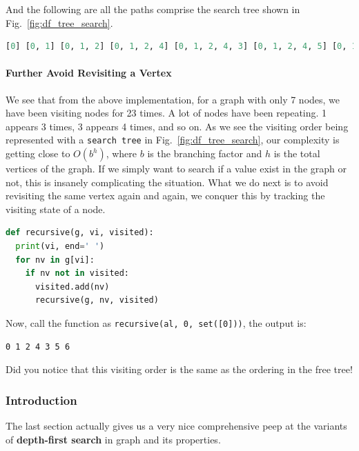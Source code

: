 \documentclass[main.tex]{subfiles}
\begin{document}
And the following are all the paths comprise the search tree shown  in Fig.~\ref{fig:df_tree_search}.
\begin{lstlisting}[language=Python]
[0] [0, 1] [0, 1, 2] [0, 1, 2, 4] [0, 1, 2, 4, 3] [0, 1, 2, 4, 5] [0, 1, 2, 4, 5, 6] [0, 1, 3] [0, 1, 3, 4] [0, 1, 3, 4, 2] [0, 1, 3, 4, 5] [0, 1, 3, 4, 5, 6] [0, 2] [0, 2, 1] [0, 2, 1, 3] [0, 2, 1, 3, 4] [0, 2, 1, 3, 4, 5] [0, 2, 1, 3, 4, 5, 6] [0, 2, 4] [0, 2, 4, 3] [0, 2, 4, 3, 1] [0, 2, 4, 5] [0, 2, 4, 5, 6] 
\end{lstlisting}


\paragraph{Further Avoid Revisiting a Vertex} We see that from the above implementation, for a graph with only 7 nodes, we have been visiting nodes for 23 times. A lot of nodes have been repeating. 1 appears 3 times, 3 appears 4 times, and so on. As we see the visiting order being represented with a \texttt{search tree} in Fig.~\ref{fig:df_tree_search}, our complexity is getting close to $O(b^h)$, where $b$ is the branching factor and $h$ is the total vertices of the graph. If we simply want to search if a value exist in the graph or not, this is insanely complicating the situation. What we do next is to avoid revisiting the same vertex again and again, we conquer this by tracking the visiting state of a node. 
\begin{lstlisting}[language=Python]
def recursive(g, vi, visited):
  print(vi, end=' ')
  for nv in g[vi]:  
    if nv not in visited: 
      visited.add(nv)
      recursive(g, nv, visited)
\end{lstlisting}
Now, call the function as \texttt{recursive(al, 0, set([0]))}, the output is:
\begin{lstlisting}[numbers=none]
0 1 2 4 3 5 6 
\end{lstlisting}
Did you notice that this visiting order is the same as the ordering in the free tree!
\subsubsection{Introduction}
The last section actually gives us a very nice comprehensive peep at the variants of \textbf{depth-first search} in graph and its properties. 
\end{document}
